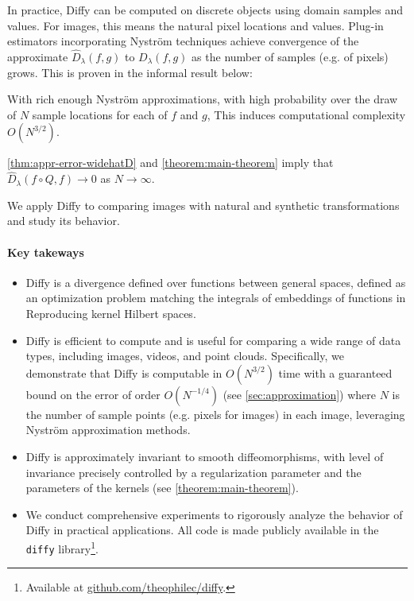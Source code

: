 In practice, Diffy can be computed on discrete objects using domain samples and values. For images, this means the natural pixel locations and values. Plug-in estimators incorporating Nyström techniques achieve convergence of the approximate $\hat D_\lambda(f, g)$ to $D_\lambda(f, g)$ as the number of samples (e.g. of pixels) grows. This is proven in the informal result below:
\begin{mdframed}
\begin{informaltheorem}
With rich enough Nyström approximations, with high probability over the draw of $N$ sample locations for each of $f$ and $g$,
This induces computational complexity $O(N^{3/2})$.
\end{informaltheorem}
\end{mdframed}
\noindent \cref{thm:appr-error-widehatD} and \cref{theorem:main-theorem} imply that $\hat D_\lambda(f\circ Q, f)\to 0$ as $N\to \infty$.

We apply Diffy to comparing images with natural and synthetic transformations and study its behavior.

\paragraph{Key takeways}

\begin{itemize}
    \item Diffy is a divergence defined over functions between general spaces, defined as an optimization problem matching the integrals of embeddings of functions in Reproducing kernel Hilbert spaces.
    \item Diffy is efficient to compute and is useful for comparing a wide range of data types, including images, videos, and point clouds. Specifically, we demonstrate that Diffy is computable in $O(N^{3/2})$ time with a guaranteed bound on the error of order $O(N^{-1/4})$ (see \cref{sec:approximation}) where $N$ is the number of sample points (e.g. pixels for images) in each image, leveraging Nyström approximation methods.
    \item Diffy is approximately invariant to smooth diffeomorphisms, with level of invariance precisely controlled by a regularization parameter and the parameters of the kernels (see \cref{theorem:main-theorem}).
    \item We conduct comprehensive experiments to rigorously analyze the behavior of Diffy in practical applications. All code is made publicly available in the \texttt{diffy} library\footnote{Available at \url{github.com/theophilec/diffy}.}.
\end{itemize}


